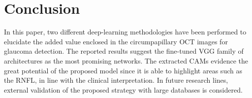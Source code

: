 \section{Conclusion} \label{sec: Conclusion}

In this paper, two different deep-learning methodologies have been performed to elucidate the added value enclosed in the circumpapillary OCT images for glaucoma detection. The reported results suggest the fine-tuned VGG family of architectures as the most promising networks. The extracted CAMs evidence the great potential of the proposed model since it is able to highlight areas such as the RNFL, in line with the clinical interpretation. In future research lines, external validation of the proposed strategy with large databases is considered.   



